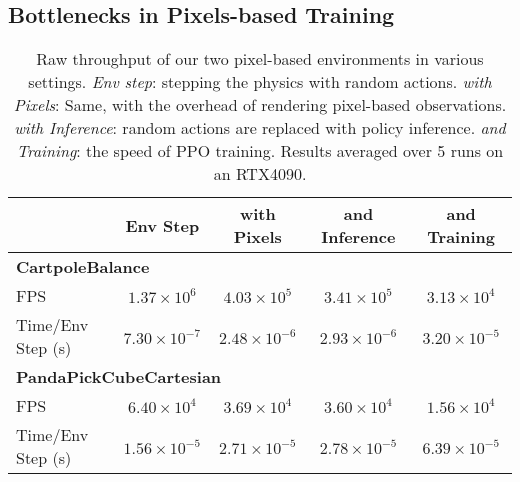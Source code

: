 \clearpage

\subsection{Bottlenecks in Pixels-based Training}
\label{sec:appendix_madrona_bottlenecks}

\begin{table}[htbp]
    \centering
    \begin{tabular}{l c c c c}
    \toprule
             & \textbf{Env Step} & \textbf{with Pixels} & \textbf{and Inference} & \textbf{and Training} \\
    \midrule
    \multicolumn{5}{l}{\textbf{CartpoleBalance}} \\ 
    FPS         & \(1.37 \times 10^6\) & \(4.03 \times 10^5\) & \(3.41 \times 10^5\) & \(3.13 \times 10^4\) \\
    Time/Env Step (s) & \(7.30 \times 10^{-7}\) & \(2.48 \times 10^{-6}\) & \(2.93 \times 10^{-6}\) & \(3.20 \times 10^{-5}\) \\
    \midrule
    \multicolumn{5}{l}{\textbf{PandaPickCubeCartesian}} \\ 
    FPS         & \(6.40 \times 10^4\) & \(3.69 \times 10^4\) & \(3.60 \times 10^4\) & \(1.56 \times 10^4\) \\
    Time/Env Step (s) & \(1.56 \times 10^{-5}\) & \(2.71 \times 10^{-5}\) & \(2.78 \times 10^{-5}\) & \(6.39 \times 10^{-5}\) \\
    \bottomrule
    \end{tabular}
    \caption{Raw throughput of our two pixel-based environments in various settings. \emph{Env step}: stepping the physics with random actions. \emph{with Pixels}: Same, with the overhead of rendering pixel-based observations. \emph{with Inference}: random actions are replaced with policy inference. \emph{and Training}: the speed of PPO training. Results averaged over 5 runs on an RTX4090.}
    \label{tab:madrona_training_breakdown_measured}
\end{table}

